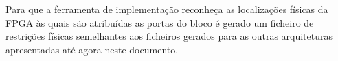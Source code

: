 


Para que a ferramenta de implementação reconheça as localizações físicas da FPGA às quais são atribuídas as portas do bloco é gerado um ficheiro de restrições físicas semelhantes aos ficheiros gerados para as outras arquiteturas apresentadas até agora neste documento. 

